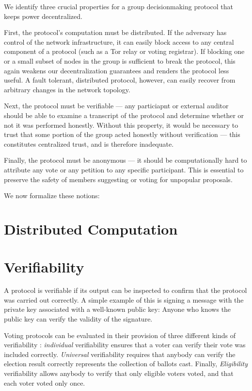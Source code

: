 We identify three crucial properties for a group decisionmaking protocol that
keeps power decentralized.

First, the protocol's computation must be distributed. If the adversary has
control of the network infrastructure, it can easily block access to any central
component of a protocol (such as a Tor relay \tocite or voting
registrar). If blocking one or a small
subset of nodes in the group is sufficient to break the protocol, this again
weakens our decentralization guarantees and renders the protocol less useful. A
fault tolerant, distributed protocol, however, can easily recover from arbitrary
changes in the network topology.

Next, the protocol must be verifiable --- any particiapnt or external auditor
should be able to examine a transcript of the protocol and determine whether or
not it was performed honestly. Without this property, it would be necessary to
trust that some portion of the group acted honestly without verification ---
this constitutes centralized trust, and is therefore inadequate.

Finally, the protocol must be anonymous --- it should be computationally hard to
attribute any vote or any petition to any specific participant. This is
essential to preserve the safety of members suggesting or voting for unpopular
proposals.

We now formalize these notions:
\section{Distributed Computation}\label{Subsection:distr}
\section{Verifiability}\label{Section:verif}
A protocol is verifiable if its output can be inspected to confirm that the
protocol was carried out correctly. A simple example of this is signing a
message with the private key associated with a well-known public key: Anyone
who knows the public key can verify the validity of the signature.

Voting protocols can be evaluated in their provision of three different
kinds of verifiability \cite{kremer_election_2010}: \emph{individual}
verifiability ensures that a voter can verify their vote was included
correctly. \emph{Universal} verifiability requires that anybody can verify
the election result correctly represents the collection of ballots cast.
Finally, \emph{Eligibility} verifiability allows anybody to verify that
only eligible voters voted, and that each voter voted only once.


